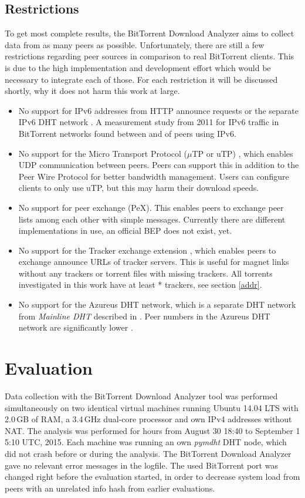 \documentclass[10pt, a4paper, twoside, headsepline]{scrbook}
\renewcommand{\_}{\origunderscore\allowbreak}
\newcommand{\range}{from August 30 18:40 to September 1 5:10 UTC, 2015}
\begin{document}
\section{Restrictions}
To get most complete results, the BitTorrent Download Analyzer aims to collect data from as many peers as possible. Unfortunately, there are still a few restrictions regarding peer sources in comparison to real BitTorrent clients. This is due to the high implementation and development effort which would be necessary to integrate each of those. For each restriction it will be discussed shortly, why it does not harm this work at large.
\begin{itemize}
\item No support for IPv6 addresses from HTTP announce requests \cite{bep7} or the separate IPv6 DHT network \cite{bep32}. A measurement study \cite[sec.~4.2.]{vyncke2012measuring} from 2011 for IPv6 traffic in BitTorrent networks found between  and  of peers using IPv6.
\item No support for the Micro Transport Protocol ($\mu$TP or uTP) \cite{bep29}, which enables UDP communication between peers. Peers can support this in addition to the Peer Wire Protocol for better bandwidth management. Users can configure clients to only use uTP, but this may harm their download speeds.
\item No support for peer exchange (PeX). This enables peers to exchange peer lists among each other with simple messages. Currently there are different implementations in use, an official BEP does not exist, yet.
\item No support for the Tracker exchange extension \cite{bep28}, which enables peers to exchange announce URLs of tracker servers. This is useful for magnet links without any trackers or torrent files with missing trackers. All torrents investigated in this work have at least * trackers, see section \ref{addr}.
\item No support for the Azureus DHT network, which is a separate DHT network from \emph{Mainline DHT} described in \cite{bep5}. Peer numbers in the Azureus DHT network are significantly lower \cite[table~5]{drachen2011distribution}.
\end{itemize}

\chapter{Evaluation}
Data collection with the BitTorrent Download Analyzer tool was performed simultaneously on two identical virtual machines running Ubuntu 14.04 LTS with 2.0\,GB of RAM, a 3.4\,GHz dual-core processor and own IPv4 addresses without NAT. The analysis was performed for  hours \range. Each machine was running an own \emph{pymdht} DHT node, which did not crash before or during the analysis. The BitTorrent Download Analyzer gave no relevant error messages in the logfile. The used BitTorrent port was changed right before the evaluation started, in order to decrease system load from peers with an unrelated info hash from earlier evaluations.
\end{document}
